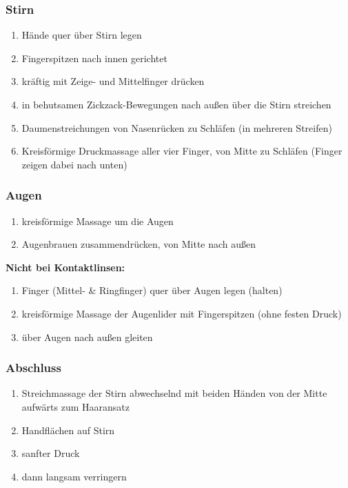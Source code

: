 \subsubsection{Stirn}
\begin{enumerate}
\item Hände quer über Stirn legen
\item Fingerspitzen nach innen gerichtet
\item kräftig mit Zeige- und Mittelfinger drücken
\item in behutsamen Zickzack-Bewegungen nach außen über die Stirn streichen
\item Daumenstreichungen von Nasenrücken zu Schläfen (in mehreren Streifen)
\item Kreisförmige Druckmassage aller vier Finger, von Mitte zu Schläfen (Finger zeigen dabei nach unten)
\end{enumerate}

\subsubsection{Augen}
\begin{enumerate}
\item kreisförmige Massage um die Augen
\item Augenbrauen zusammendrücken, von Mitte nach außen
\end{enumerate}

\textbf{Nicht bei Kontaktlinsen:}
\begin{enumerate}
\item Finger (Mittel- \& Ringfinger) quer über Augen legen (halten)
\item kreisförmige Massage der Augenlider mit Fingerspitzen (ohne festen Druck)
\item über Augen nach außen gleiten
\end{enumerate}

\subsubsection{Abschluss}
\begin{enumerate}
\item Streichmassage der Stirn abwechselnd mit beiden Händen von der Mitte aufwärts zum Haaransatz
\item Handflächen auf Stirn
\item sanfter Druck
\item dann langsam verringern
\end{enumerate}

